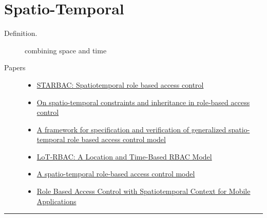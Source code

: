 \documentclass[letterpaper,10pt,english]{sphinxmanual}
\begin{document}
\chapter{Spatio-Temporal}
\label{categories/spatio_temporal:spatio-temporal}\label{categories/spatio_temporal::doc}\begin{description}
\item[{Definition.}] \leavevmode
combining space and time

\item[{Papers}] \leavevmode\begin{itemize}
\item {} 
\href{http://www.springerlink.com/index/tq15n88122v63754.pdf}{STARBAC: Spatiotemporal role based access control}

\item {} 
\href{http://dl.acm.org/citation.cfm?id=1368341}{On spatio-temporal constraints and inheritance in role-based access control}

\item {} 
\href{https://www.cerias.purdue.edu/tools\_and\_resources/bibtex\_archive/archive/2007-08.pdf}{A framework for specification and verification of generalized spatio-temporal role based access control model}

\item {} 
\href{http://www.springerlink.com/index/77j0j540004585wv.pdf}{LoT-RBAC: A Location and Time-Based RBAC Model}

\item {} 
\href{http://www.springerlink.com/index/C3T50338535HX115.pdf}{A spatio-temporal role-based access control model}

\item {} 
\href{http://www.springerlink.com/index/r1n6j114g5431174.pdf}{Role Based Access Control with Spatiotemporal Context for Mobile Applications}

\end{itemize}

\end{description}


\bigskip\hrule{}\bigskip
\end{document}

